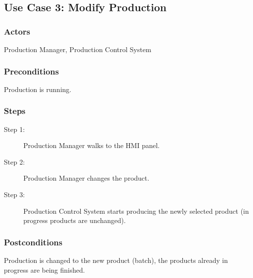 \subsection{Use Case 3: Modify Production}

\subsubsection{Actors}
Production Manager, Production Control System

\subsubsection{Preconditions}
Production is running.

\subsubsection{Steps}
\begin{description}
    \item[Step 1:] Production Manager walks to the HMI panel.
    \item[Step 2:] Production Manager changes the product.
    \item[Step 3:] Production Control System starts producing the newly selected product (in progress products are unchanged).
\end{description}

\subsubsection{Postconditions}
Production is changed to the new product (batch), the products already in progress are being finished.%
